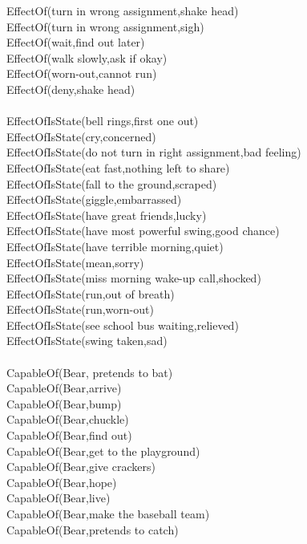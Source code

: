 \begin{multicols}{2}
\begin{footnotesize}
EffectOf(turn in wrong assignment,shake head) \\
EffectOf(turn in wrong assignment,sigh) \\
EffectOf(wait,find out later) \\
EffectOf(walk slowly,ask if okay) \\
EffectOf(worn-out,cannot run) \\
EffectOf(deny,shake head) \\
~\\
EffectOfIsState(bell rings,first one out) \\
EffectOfIsState(cry,concerned) \\
EffectOfIsState(do not turn in right assignment,bad feeling) \\
EffectOfIsState(eat fast,nothing left to share) \\
EffectOfIsState(fall to the ground,scraped) \\
EffectOfIsState(giggle,embarrassed) \\
EffectOfIsState(have great friends,lucky) \\
EffectOfIsState(have most powerful swing,good chance) \\
EffectOfIsState(have terrible morning,quiet) \\
EffectOfIsState(mean,sorry) \\
EffectOfIsState(miss morning wake-up call,shocked) \\
EffectOfIsState(run,out of breath) \\
EffectOfIsState(run,worn-out) \\
EffectOfIsState(see school bus waiting,relieved) \\
EffectOfIsState(swing taken,sad) \\
~\\
CapableOf(Bear, pretends to bat) \\
CapableOf(Bear,arrive) \\
CapableOf(Bear,bump) \\
CapableOf(Bear,chuckle) \\
CapableOf(Bear,find out) \\
CapableOf(Bear,get to the playground) \\
CapableOf(Bear,give crackers) \\
CapableOf(Bear,hope) \\
CapableOf(Bear,live) \\
CapableOf(Bear,make the baseball team) \\
CapableOf(Bear,pretends to catch) \\

\end{footnotesize}
\end{multicols}
